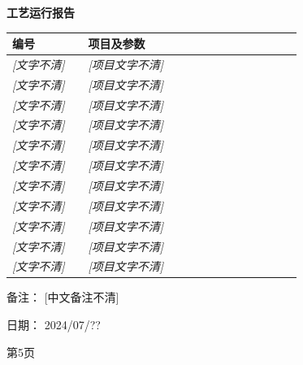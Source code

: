 \documentclass[UTF8,10pt,a4paper,fontset=fandol]{ctexart}
\newcommand{\fieldvalue}[1]{#1}
\newcommand{\handwritten}[1]{#1}
\begin{document}
\newpage

\noindent
\begin{minipage}[t]{0.43\linewidth}
\centering
\textbf{工艺运行报告}

\vspace{0.5em}

\begin{tabular}{|p{0.22\linewidth}|p{0.62\linewidth}|}
\hline
\textbf{编号} & \textbf{项目及参数} \\ \hline
\textit{[文字不清]} & \textit{[项目文字不清]} \\ \hline
\textit{[文字不清]} & \textit{[项目文字不清]} \\ \hline
\textit{[文字不清]} & \textit{[项目文字不清]} \\ \hline
\textit{[文字不清]} & \textit{[项目文字不清]} \\ \hline
\textit{[文字不清]} & \textit{[项目文字不清]} \\ \hline
\textit{[文字不清]} & \textit{[项目文字不清]} \\ \hline
\textit{[文字不清]} & \textit{[项目文字不清]} \\ \hline
\textit{[文字不清]} & \textit{[项目文字不清]} \\ \hline
\textit{[文字不清]} & \textit{[项目文字不清]} \\ \hline
\textit{[文字不清]} & \textit{[项目文字不清]} \\ \hline
\textit{[文字不清]} & \textit{[项目文字不清]} \\ \hline
\end{tabular}

\vspace{1em}

备注：%
\fieldvalue{\handwritten{[中文备注不清]}}

\vspace{0.5em}

日期：%
\fieldvalue{\handwritten{2024/07/??}}

\vfill
\raggedleft 第5页
\end{minipage}
\hfill
\end{document}
